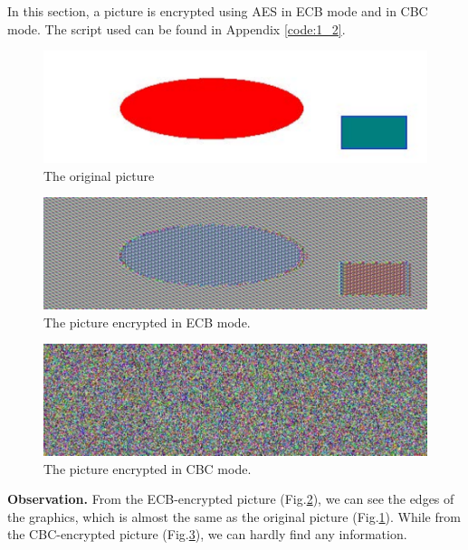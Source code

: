 In this section, a picture is encrypted using AES in ECB mode and in CBC mode. The script used can be found in Appendix \ref{code:1_2}.

\begin{figure}[tb!]
\centering
\includegraphics[width=\columnwidth]{pictures/pic_original.pdf}
\caption{
    The original picture
}
\label{fig:pic_original}
\end{figure}

\begin{figure}[tb!]
\centering
\includegraphics[width=\columnwidth]{pictures/pic_ecb.pdf}
\caption{
    The picture encrypted in ECB mode.
}
\label{fig:pic_ecb}
\end{figure}

\begin{figure}[tb!]
\centering
\includegraphics[width=\columnwidth]{pictures/pic_cbc.pdf}
\caption{
    The picture encrypted in CBC mode.
}
\label{fig:pic_cbc}
\end{figure}

\textbf{Observation.}
From the ECB-encrypted picture (Fig.\ref{fig:pic_ecb}), we can see the edges of the graphics, which is almost the same as the original picture (Fig.\ref{fig:pic_original}).
While from the CBC-encrypted picture (Fig.\ref{fig:pic_cbc}), we can hardly find any information.


